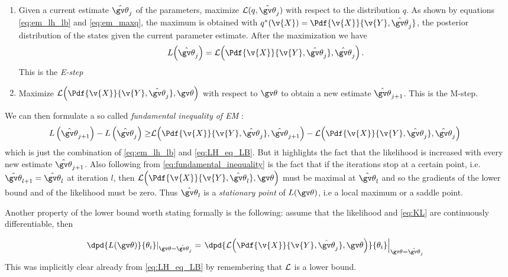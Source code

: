 \begin{enumerate}
  \item Given a current estimate $\hat{\Th}_j$ of the parameters, maximize
  $\LB(q,\hat{\Th}_j)$ with respect to the distribution $q$. As shown by equations 
  \eqref{eq:em_lh_lb} and \eqref{eq:em_maxq}, the maximum is obtained with 
  $q^*(\v{X}) = \Pdf{\v{X}}{\v{Y},\hat{\Th}_j}$, the posterior
  distribution of the states given the current parameter estimate. After the maximization
  we have
  	\begin{align}
  		L\!\left(\hat{\Th}_j\right)=\LB\!\left(\Pdf{\v{X}}{\v{Y},\hat{\Th}_j},\hat{\Th}_j\right).  
		\label{eq:LH_eq_LB}
	\end{align}
	This is the \emph{E-step} 
  \item Maximize $\LB\!\left(\Pdf{\v{X}}{\v{Y},\hat{\Th}_j},\Th\right)$ with respect
  to $\Th$ to obtain a new estimate $\hat{\Th}_{j+1}$. This is the M-step.
\end{enumerate}
We can then formulate a so called \emph{fundamental inequality of EM} \parencite{Cappe2005}:
\begin{align}
	L\left(\hat{\Th}_{j+1}\right) - L\left(\hat{\Th}_j\right)\geq & \LB\!\left(\Pdf{\v{X}}{\v{Y},\hat{\Th}_j},\hat{\Th}_{j+1}\right) - \LB\!\left(\Pdf{\v{X}}{\v{Y},\hat{\Th}_j},\hat{\Th}_{j}\right) 
	\label{eq:fundamental_inequality}
\end{align}
which is just the combination of \eqref{eq:em_lh_lb} and \eqref{eq:LH_eq_LB}. But it highlights
the fact that the likelihood is increased with every new estimate $\hat{\Th}_{j+1}$.
Also following from \eqref{eq:fundamental_inequality} is the fact that if the iterations
stop at a certain point, i.e. $\hat{\Th}_{l+1}=\hat{\Th}_l$ at iteration $l$, then
$\LB\!\left(\Pdf{\v{X}}{\v{Y},\hat{\Th}_l},\Th\right)$ must be maximal at $\hat{\Th}_l$
and so the gradients of the lower bound and of the likelihood must be zero. Thus
$\hat{\Th}_l$ is a \emph{stationary point} of $L(\Th)$, i.e a local maximum or a saddle point.



Another property of the lower bound worth stating formally is the following: assume that
the likelihood and \eqref{eq:KL} are continuously differentiable, then

\begin{align}
		\left.\dpd{\lLH}{\theta_i}\right|_{\Th=\hat{\Th}_j}&=\left.\dpd{\LB\!\left(\Pdf{\v{X}}{\v{Y},\hat{\Th}_j},\Th\right)}{\theta_i}\right|_{\Th=\hat{\Th}_j} \label{eq:EM_gradients}
\end{align}
This was implicitly clear already from \eqref{eq:LH_eq_LB} by remembering that $\mathcal{L}$ is a lower
bound.

